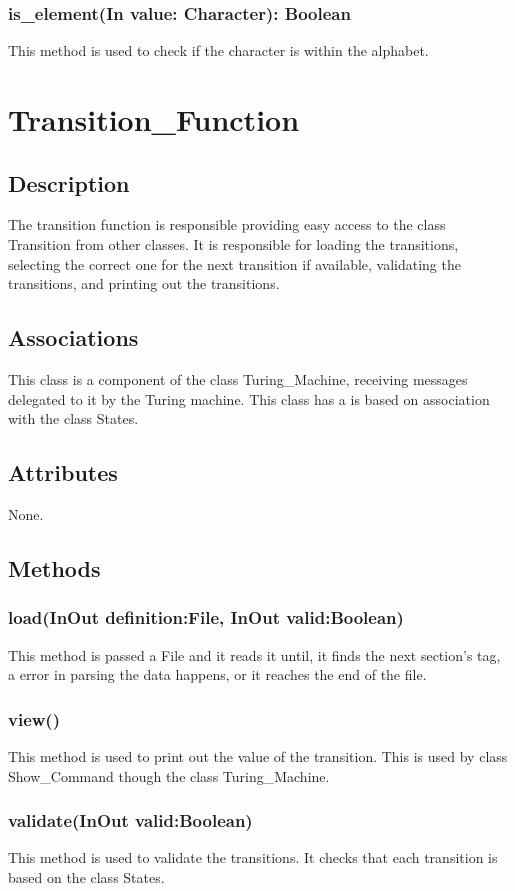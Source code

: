 \documentclass{report}
\begin{document}
    
    \subsubsection{is\_element(In value: Character): Boolean}
    This method is used to check if the character is within the alphabet. 
    
    
    
      \section{Transition\_Function}
	\subsection{Description}
    The transition function is responsible providing easy access to the class Transition from other classes. It is responsible for loading the transitions, selecting the correct one for the next transition if available, validating the transitions, and printing out the transitions.
    \subsection{Associations} 
     This class is a component of the class Turing\_Machine, receiving messages delegated to it by the Turing machine.
     This class has a is based on association with the class States.
    \subsection{Attributes} 
    None.
    \subsection{Methods} 
      \subsubsection{load(InOut definition:File, InOut valid:Boolean)}
      This method is passed a File and it reads it until, it finds the next section's tag, a error in parsing the data happens, or it reaches the end of the file.
      \subsubsection{view()}
      	This method is used to print out the value of the transition. This is used by class Show\_Command though the class Turing\_Machine.
      \subsubsection{validate(InOut valid:Boolean)}
      This method is used to validate the transitions. It checks that each transition is based on the class States.
\end{document}
